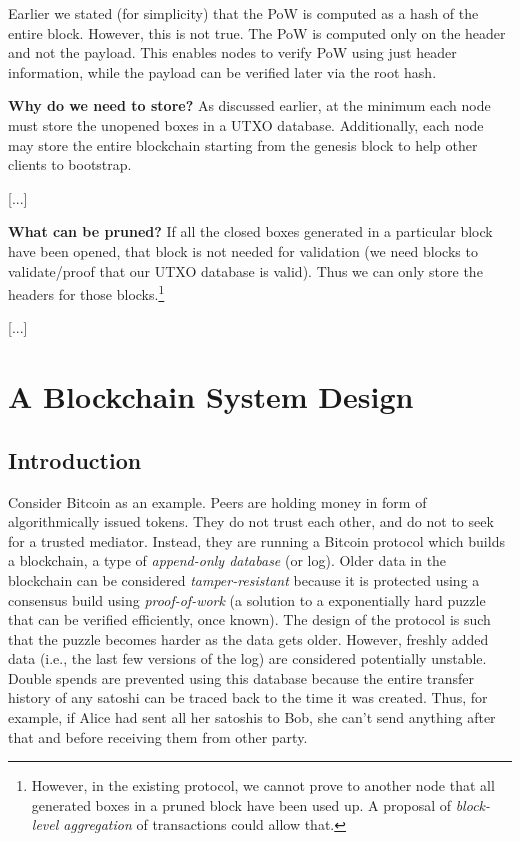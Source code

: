 \documentclass[]{report}   %
\begin{document}
Earlier we stated (for simplicity) that the PoW is computed as a hash of the entire block. However, this is not true. The PoW is computed only on the header and not the payload. This enables nodes to verify PoW using just header information, while the payload can be verified later via the root hash. 

\textbf{Why do we need to store?} As discussed earlier, at the minimum each node must store the unopened boxes in a UTXO database. Additionally, each node may store the entire blockchain starting from the genesis block to help other clients to bootstrap. 

[...]

\textbf{What can be pruned?} If all the closed boxes generated in a particular block have been opened, that block is not needed for validation (we need blocks to validate/proof that our UTXO database is valid). Thus we can only store the headers for those blocks.\footnote{However, in the existing protocol, we cannot prove to another node that all generated boxes in a pruned block have been used up. A proposal of {\em block-level aggregation} of transactions could allow that.}


[...]



\chapter{A Blockchain System Design}             %
\section{Introduction}     


Consider Bitcoin as an example. Peers are holding money in form of algorithmically issued tokens. They do not trust each other, and do not to seek for a trusted mediator. Instead, they are running a Bitcoin protocol which builds a blockchain, a type of {\em append-only database} (or log). Older data in the blockchain can be considered {\em tamper-resistant} because it is protected using a consensus build using {\em proof-of-work} (a solution to a exponentially hard puzzle that can be verified efficiently, once known). The design of the protocol is such that the puzzle becomes harder as the data gets older. However, freshly added data (i.e., the last few versions of the log) are considered potentially unstable. Double spends are prevented using this database because the entire transfer history of any satoshi can be traced back to the time it was created. Thus, for example, if Alice had sent all her satoshis to Bob, she can't send anything after that and before receiving them from other party.
\end{document}

